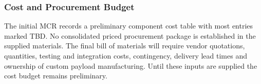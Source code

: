 \subsubsection{Cost and Procurement Budget}\label{app:cost-bom}
The initial MCR records a preliminary component cost table with most entries marked TBD. No consolidated priced procurement package is established in the supplied materials. The final bill of materials will require vendor quotations, quantities, testing and integration costs, contingency, delivery lead times and ownership of custom payload manufacturing. Until these inputs are supplied the cost budget remains preliminary.
